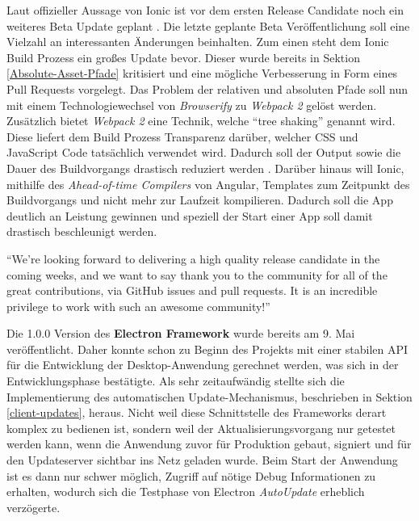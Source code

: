 Laut offizieller Aussage von Ionic ist vor dem ersten Release Candidate noch ein weiteres Beta Update geplant \cite{Annou88:online}.
Die letzte geplante Beta Veröffentlichung soll eine Vielzahl an interessanten
Änderungen beinhalten. Zum einen steht dem Ionic Build Prozess ein großes Update bevor.
Dieser wurde bereits in Sektion \ref{Absolute-Asset-Pfade} kritisiert und eine
mögliche Verbesserung in Form eines Pull Requests vorgelegt.
Das Problem der relativen und absoluten Pfade soll nun mit einem Technologiewechsel von \emph{Browserify} zu \emph{Webpack 2} gelöst werden.
Zusätzlich bietet \emph{Webpack 2} eine Technik, welche ``tree shaking'' genannt wird.
Diese liefert dem Build Prozess Transparenz darüber, welcher \ac{CSS} und JavaScript Code tatsächlich verwendet wird.
Dadurch soll der Output sowie die Dauer des Buildvorgangs drastisch reduziert werden \cite{Annou88:online}.
Darüber hinaus will Ionic, mithilfe des \emph{Ahead-of-time Compilers} von Angular, Templates zum Zeitpunkt des Buildvorgangs und nicht mehr zur Laufzeit kompilieren.
Dadurch soll die App deutlich an Leistung gewinnen und speziell der Start einer App soll damit drastisch beschleunigt werden.

\vspace{0.3cm}

``We’re looking forward to delivering a high quality release candidate in the coming weeks,
and we want to say thank you to the community for all of the great contributions,
via GitHub issues and pull requests. It is an incredible privilege to work with such an awesome community!'' \cite{Annou88:online}

\vspace{0.3cm}

\noindent
Die 1.0.0 Version des \textbf{Electron Framework} wurde bereits am 9. Mai veröffentlicht.
Daher konnte schon zu Beginn des Projekts \projectname{} mit einer stabilen API für die Entwicklung
der Desktop-Anwendung gerechnet werden, was sich in der Entwicklungsphase bestätigte.
Als sehr zeitaufwändig stellte sich die Implementierung des automatischen
Update-Mechanismus, beschrieben in Sektion \ref{client-updates}, heraus.
Nicht weil diese Schnittstelle des Frameworks derart komplex zu bedienen ist, sondern weil der Aktualisierungsvorgang nur getestet werden kann,
wenn die Anwendung zuvor für Produktion gebaut, signiert und für den Updateserver sichtbar ins Netz geladen wurde.
Beim Start der Anwendung ist es dann nur schwer möglich, Zugriff auf nötige Debug Informationen zu erhalten,
wodurch sich die Testphase von Electron \emph{AutoUpdate} erheblich verzögerte.



